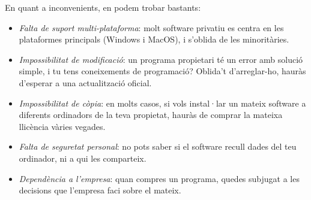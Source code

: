 En quant a inconvenients, en podem trobar bastants:
\begin{itemize}
\item \emph{Falta de suport multi-plataforma}: molt software privatiu es centra en les plataformes principals (Windows i MacOS),
i s'oblida de les minoritàries.
\item \emph{Impossibilitat de modificació}: un programa propietari té un error amb solució simple, i tu tens coneixements de
programació? Oblida't d'arreglar-ho, hauràs d'esperar a una actualització oficial.
\item \emph{Impossibilitat de còpia}: en molts casos, si vols instal·lar un mateix software a diferents ordinadors de la teva
propietat, hauràs de comprar la mateixa llicència vàries vegades.
\item \emph{Falta de seguretat personal}: no pots saber si el software recull dades del teu ordinador, ni a qui les comparteix.
\item \emph{Dependència a l'empresa}: quan compres un programa, quedes subjugat a les decisions que l'empresa faci sobre el mateix.
\end{itemize}


